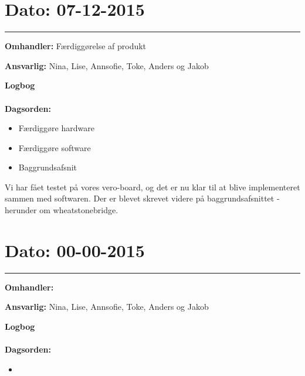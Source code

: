 	
	
\section{Dato: 07-12-2015 }
\hrule

\textbf{Omhandler:} Færdiggørelse af produkt

\textbf{Ansvarlig:} Nina, Lise, Annsofie, Toke, Anders og Jakob

\textbf{Logbog}
\\
\\
\textbf{Dagsorden:}
\begin{itemize}
	\item Færdiggøre hardware
	\item Færdiggøre software
	\item Baggrundsafsnit
\end{itemize}

Vi har fået testet på vores vero-board, og det er nu klar til at blive implementeret sammen med softwaren. 
Der er blevet skrevet videre på baggrundsafsnittet - herunder om wheatstonebridge.


	
	
\section{Dato: 00-00-2015 }
\hrule

\textbf{Omhandler:} 

\textbf{Ansvarlig:} Nina, Lise, Annsofie, Toke, Anders og Jakob

\textbf{Logbog}
\\
\\
\textbf{Dagsorden:}
\begin{itemize}
	\item 
\end{itemize}
